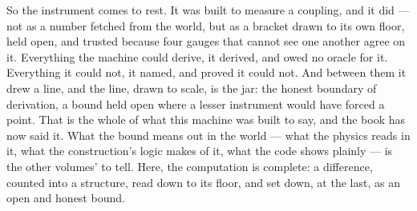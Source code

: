 So the instrument comes to rest. It was built to measure a coupling, and it did --- not as a number fetched from the
world, but as a bracket drawn to its own floor, held open,
and trusted because four gauges that cannot see one another agree on it. Everything the machine could derive, it derived,
and owed no oracle for it. Everything it could not, it named, and proved it could not. And between them it drew a line,
and the line, drawn to scale, is the jar: the honest boundary of derivation, a bound held open where a lesser instrument
would have forced a point. That is the whole of what this machine was built to say, and the book has now said it. What the
bound means out in the world --- what the physics reads in it, what the construction's logic makes of it, what the code
shows plainly --- is the other volumes' to tell. Here, the computation is complete: a difference, counted into a
structure, read down to its floor, and set down, at the last, as an open and honest bound.
